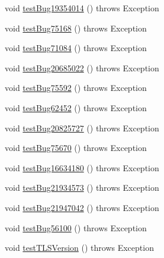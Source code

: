 \begin{DoxyCompactItemize}
\item 
void \mbox{\hyperlink{classtestsuite_1_1regression_1_1_connection_regression_test_a3eea52c252e252b39fbfb93bcc80d26a}{test\+Bug19354014}} ()  throws Exception 
\item 
void \mbox{\hyperlink{classtestsuite_1_1regression_1_1_connection_regression_test_a481102d0bf994ee0a48b67f1a1328c43}{test\+Bug75168}} ()  throws Exception 
\item 
void \mbox{\hyperlink{classtestsuite_1_1regression_1_1_connection_regression_test_aa979b5c63116b99ad91121c84a0af973}{test\+Bug71084}} ()  throws Exception 
\item 
void \mbox{\hyperlink{classtestsuite_1_1regression_1_1_connection_regression_test_a1a63a52aeb982d168ebee3c0cb30bc59}{test\+Bug20685022}} ()  throws Exception 
\item 
void \mbox{\hyperlink{classtestsuite_1_1regression_1_1_connection_regression_test_a665407a24ed690a64058e8f86c4d6063}{test\+Bug75592}} ()  throws Exception 
\item 
void \mbox{\hyperlink{classtestsuite_1_1regression_1_1_connection_regression_test_a622960dd50328718a00cdad9f046f1d9}{test\+Bug62452}} ()  throws Exception 
\item 
void \mbox{\hyperlink{classtestsuite_1_1regression_1_1_connection_regression_test_a90f5472dadf388f9b00461fc39ddeb21}{test\+Bug20825727}} ()  throws Exception 
\item 
void \mbox{\hyperlink{classtestsuite_1_1regression_1_1_connection_regression_test_ae51a7e49df56ea469720a9d165fc124a}{test\+Bug75670}} ()  throws Exception 
\item 
void \mbox{\hyperlink{classtestsuite_1_1regression_1_1_connection_regression_test_a93aad983034e220127a84017e297d492}{test\+Bug16634180}} ()  throws Exception 
\item 
void \mbox{\hyperlink{classtestsuite_1_1regression_1_1_connection_regression_test_a1cbe215e0e75477350d50bfaa49af95e}{test\+Bug21934573}} ()  throws Exception 
\item 
void \mbox{\hyperlink{classtestsuite_1_1regression_1_1_connection_regression_test_a071fe5a492bac37a1a3f0c9326d44ed8}{test\+Bug21947042}} ()  throws Exception 
\item 
void \mbox{\hyperlink{classtestsuite_1_1regression_1_1_connection_regression_test_a5b74dbc899a9fefe265aabac1e1818ce}{test\+Bug56100}} ()  throws Exception 
\item 
void \mbox{\hyperlink{classtestsuite_1_1regression_1_1_connection_regression_test_a8a5b38389d6365d90769f30887196749}{test\+T\+L\+S\+Version}} ()  throws Exception 

\end{DoxyCompactItemize}
